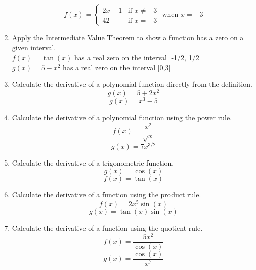 \documentclass{exam}
\begin{document}
\begin{enumerate}
$$f(x) = \left\{\begin{array}{rl}2x-1 &\mbox{if }x \neq -3\\ 42 &\mbox{if }x = -3\end{array} \mbox{ when } x= - 3\right.$$
\item Apply the Intermediate Value Theorem to show a function has a zero on a given interval.\\
$f(x) = \tan(x)$ has a real zero on the interval [-1/2, 1/2]\\
$g(x) = 5 - x^2$ has a real zero on the interval [0,3]
\item Calculate the derivative of a polynomial function directly from the definition.\\
$$g(x) = 5 + 2x^2$$
$$g(x) = x^3  - 5$$
\item Calculate the derivative of a polynomial function using the power rule.\\
$$f(x) = \frac{x^2}{\sqrt{x}}$$
$$g(x) = 7x^{3/2}$$
\item Calculate the derivative of a trigonometric function.\\
$$g(x) = \cos(x)$$
$$f(x) = \tan(x)$$
\item Calculate the derivative of a function using the product rule.\\ 
$$f(x) = 2x^5\sin(x)$$
$$g(x) = \tan(x)\sin(x)$$
\item Calculate the derivative of a function using the quotient rule.\\
$$f(x) = \frac{5x^2}{\cos(x)}$$
$$g(x) = \frac{\cos(x)}{x^7}$$

\end{enumerate}
\end{document}

